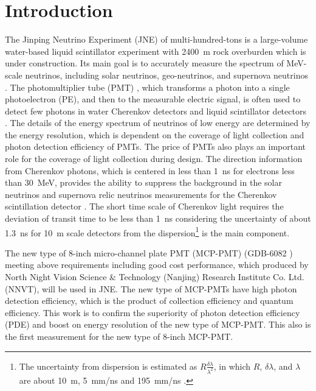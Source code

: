 \section{Introduction}
The Jinping Neutrino Experiment (JNE) of multi-hundred-tons is a large-volume water-based liquid scintillator experiment with \SI{2400}{m} rock overburden \cite{LetterJNE2017} which is under construction. Its main goal is to accurately measure the spectrum of MeV-scale neutrinos, including solar neutrinos, geo-neutrinos, and supernova neutrinos \cite{LetterJNE2017}. %
The photomultiplier tube (PMT) \cite{HAMAMATSUManual}, which transforms a photon into a single photoelectron (PE), and then to the measurable electric signal, is often used to detect few photons in water Cherenkov detectors \cite{SNO,SuperK} and liquid scintillator detectors \cite{KamLAND,JUNO:2015zny}. The details of the energy spectrum of neutrinos of low energy are determined by the energy resolution, which is dependent on the coverage of light collection and photon detection efficiency of PMTs. The price of PMTs also plays an important role for the coverage of light collection during design. The direction information from Cherenkov photons, which is centered in less than \SI{1}{ns} for electrons less than \SI{30}{MeV}, provides the ability to suppress the background in the solar neutrinos and supernova relic neutrinos measurements for the Cherenkov scintillation detector \cite{Guo_2019}. The short time scale of Cherenkov light requires the deviation of transit time to be less than \SI{1}{ns} considering the uncertainty of about \SI{1.3}{ns} for \SI{10}{m} scale detectors from the dispersion\footnote{The uncertainty from dispersion is estimated as $R\frac{\delta\lambda}{\lambda^2}$, in which $R$, $\delta\lambda$, and $\lambda$ are about \SI{10}{m}, \SI{5}{mm/ns} and \SI{195}{mm/ns} \cite{Luo:2022xrd}.} is the main component.

The new type of 8-inch micro-channel plate PMT (MCP-PMT) (GDB-6082 \cite{GDB-6082}) meeting above requirements including good cost performance, which produced by North Night Vision Science \& Technology (Nanjing) Research Institute Co. Ltd. (NNVT), will be used in JNE. The new type of MCP-PMTs have high photon detection efficiency, which is the product of collection efficiency and quantum efficiency. This work is to confirm the superiority of photon detection efficiency (PDE) and boost on energy resolution of the new type of MCP-PMT. This also is the first measurement for the new type of 8-inch MCP-PMT.

